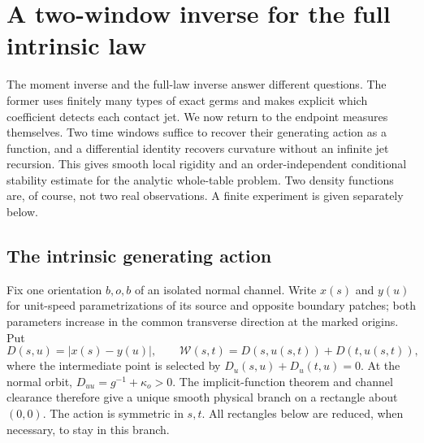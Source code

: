 \section{A two-window inverse for the full intrinsic law}
\label{sec:two-window}
The moment inverse and the full-law inverse answer different questions.
The former uses finitely many types of exact germs and makes explicit
which coefficient detects each contact jet. We now return to the
endpoint measures themselves. Two time windows suffice to recover their
generating action as a function, and a differential identity recovers
curvature without an infinite jet recursion. This gives smooth local
rigidity and an order-independent conditional stability estimate for
the analytic whole-table problem. Two density functions are, of course,
not two real observations. A finite experiment is given separately below.

\subsection{The intrinsic generating action}
Fix one orientation $b,o,b$ of an isolated normal channel. Write
$x(s)$ and $y(u)$ for unit-speed parametrizations of its source and
opposite boundary patches; both parameters increase in the common
transverse direction at the marked origins. Put
\[
 D(s,u)=|x(s)-y(u)|,\qquad
 \mathcal W(s,t)=D(s,u(s,t))+D(t,u(s,t)),
\]
where the intermediate point is selected by
$D_u(s,u)+D_u(t,u)=0$. At the normal orbit,
$D_{uu}=g^{-1}+\kappa_o>0$. The implicit-function theorem and channel
clearance therefore give a unique smooth physical branch on a rectangle
about $(0,0)$. The action is symmetric in $s,t$. All rectangles below
are reduced, when necessary, to stay in this branch.

